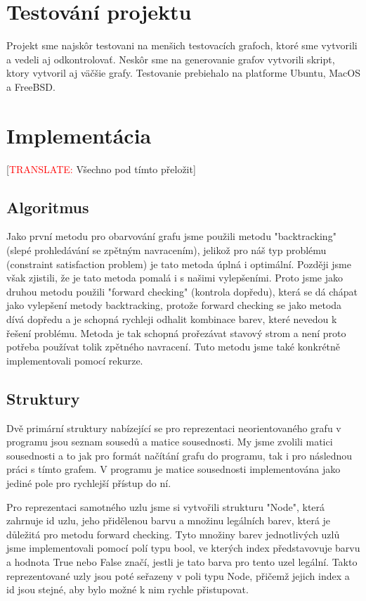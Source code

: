\documentclass[a4paper,11pt]{article}
\begin{document}
\section{Testování projektu}
Projekt sme najskôr testovani na menšich testovacích grafoch, ktoré sme vytvorili a vedeli aj odkontrolovať. Neskôr sme na generovanie grafov vytvorili skript, ktory vytvoril aj väčšie grafy. Testovanie prebiehalo na platforme Ubuntu, MacOS a FreeBSD.

\section{Implementácia}
[\textcolor{red}{TRANSLATE: }Všechno pod tímto přeložit]

\subsection{Algoritmus}
Jako první metodu pro obarvování grafu jsme použili metodu "backtracking" (slepé prohledávání se zpětným navracením), jelikož pro náš typ problému (constraint satisfaction problem) je tato metoda úplná i optimální. Později jsme však zjistili, že je tato metoda pomalá i s našimi vylepšeními. 
Proto jsme jako druhou metodu použili "forward checking" (kontrola dopředu), která se dá chápat jako vylepšení metody backtracking, protože forward checking se jako metoda dívá dopředu a je schopná rychleji odhalit kombinace barev, které nevedou k řešení problému. Metoda je tak schopná prořezávat stavový strom a není proto potřeba používat tolik zpětného navracení. Tuto metodu jsme také konkrétně implementovali pomocí rekurze.

\subsection{Struktury}
Dvě primární struktury nabízející se pro reprezentaci neorientovaného grafu v programu jsou seznam sousedů a matice sousednosti. My jsme zvolili matici sousednosti a to jak pro formát načítání grafu do programu, tak i pro následnou práci s tímto grafem. V programu je matice sousednosti implementována jako jediné pole pro rychlejší přístup do ní.

Pro reprezentaci samotného uzlu jsme si vytvořili strukturu "Node", která zahrnuje id uzlu, jeho přidělenou barvu a množinu legálních barev, která je důležitá pro metodu forward checking. Tyto množiny barev jednotlivých uzlů jsme implementovali pomocí polí typu bool, ve kterých index představovuje barvu a hodnota True nebo False značí, jestli je tato barva pro tento uzel legální. Takto reprezentované uzly jsou poté seřazeny v poli typu Node, přičemž jejich index a id jsou stejné, aby bylo možné k nim rychle přistupovat.
\end{document}
